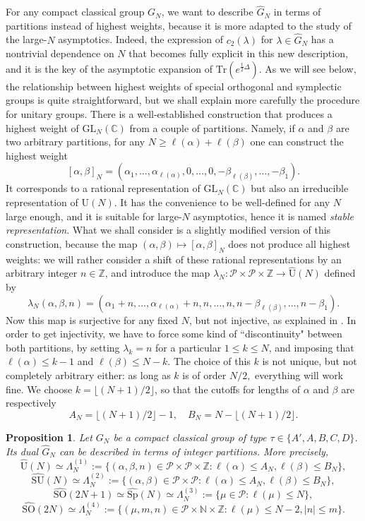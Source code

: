\documentclass[11pt,a4paper,reqno]{article}
\newtheorem{proposition}[theorem]{Proposition}
\theoremstyle{definition}
\theoremstyle{remark}
\newcommand\SU{{\mathrm{SU}}}
\newcommand\SO{{\mathrm{SO}}}
\newcommand\Sp{{\mathrm{Sp}}}
\newcommand\GL{{\mathrm{GL}}}
\newcommand\U{{\mathrm U}}
\newcommand\Z{{\mathbb Z}}
\newcommand\N{{\mathbb N}}
\newcommand\C{\mathbb{C}}
\newcommand\Tr{\mathrm{Tr}}
\newcommand\Pfr{\mathscr{P}}
\begin{document}
For any compact classical group $G_N$, we want to describe $\widehat{G}_N$ in terms of partitions instead of highest weights, because it is more adapted to the study of the large-$N$ asymptotics. Indeed, the expression of $c_2(\lambda)$ for $\lambda\in\widehat{G}_N$ has a nontrivial dependence on $N$ that becomes fully explicit in this new description, and it is the key of the asymptotic expansion of $\Tr(e^{\frac{t}{2}\Delta})$. As we will see below, the relationship between highest weights of special orthogonal and symplectic groups is quite straightforward, but we shall explain more carefully the procedure for unitary groups. There is a well-established construction \cite{Sta,Koi} that produces a highest weight of $\GL_N(\C)$ from a couple of partitions. Namely, if $\alpha$ and $\beta$ are two arbitrary partitions, for any $N\geq \ell(\alpha)+\ell(\beta)$ one can construct the highest weight
\[
[\alpha,\beta]_N=(\alpha_1,\ldots,\alpha_{\ell(\alpha)},0,\ldots,0,-\beta_{\ell(\beta)},\ldots,-\beta_1).
\]
It corresponds to a rational representation of $\GL_N(\C)$ but also an irreducible representation of $\U(N)$. It has the convenience to be well-defined for any $N$ large enough, and it is suitable for large-$N$ asymptotics, hence it is named \emph{stable representation}. What we shall consider is a slightly modified version of this construction, because the map $(\alpha,\beta)\mapsto [\alpha,\beta]_N$ does not produce all highest weights: we will rather consider a shift of these rational representations by an arbitrary integer $n\in\Z$, and introduce the map $\lambda_N:\Pfr\times\Pfr\times\Z\to\widehat{\U}(N)$ defined by
\[
\lambda_N(\alpha,\beta,n)=(\alpha_1+n,\ldots,\alpha_{\ell(\alpha)}+n,n,\ldots,n,n-\beta_{\ell(\beta)},\ldots,n-\beta_1).
\]
Now this map is surjective for any fixed $N$, but not injective, as explained in \cite[\S 2.2]{Lem}. In order to get injectivity, we have to force some kind of ``discontinuity" between both partitions, by setting $\lambda_k=n$ for a particular $1\leq k\leq N$, and imposing that $\ell(\alpha)\leq k-1$ and $\ell(\beta)\leq N-k$. The choice of this $k$ is not unique, but not completely arbitrary either: as long as $k$ is of order $N/2,$ everything will work fine. We choose $k=\lfloor(N+1)/2\rfloor$, so that the cutoffs for lengths of $\alpha$ and $\beta$ are respectively
\[
A_N=\lfloor(N+1)/2\rfloor-1,\quad B_N=N-\lfloor(N+1)/2\rfloor.
\]

\begin{proposition}\label{prop:dual_sets}
Let $G_N$ be a compact classical group of type $\tau\in\{A',A,B,C,D\}$. Its dual $\widehat{G}_N$ can be described in terms of integer partitions. More precisely,
\[
\widehat{\U}(N)\simeq \Lambda_N^{(1)}:=\{(\alpha,\beta,n)\in\Pfr\times\Pfr\times\Z:\ell(\alpha)\leq A_N,\ell(\beta)\leq B_N\},
\]
\[
\widehat{\SU}(N)\simeq \Lambda_N^{(2)}:= \{(\alpha,\beta)\in\Pfr\times\Pfr:\ell(\alpha)\leq A_N,\ell(\beta)\leq B_N\},
\]
\[
\widehat{\SO}(2N+1)\simeq\widehat{\Sp}(N)\simeq \Lambda_N^{(3)}:=\{\mu\in\Pfr:\ell(\mu)\leq N\},
\]
\[
\widehat{\SO}(2N)\simeq\Lambda_N^{(4)}:=\{(\mu,m,n)\in\Pfr\times\N\times\Z: \ell(\mu)\leq N-2, \vert n\vert\leq m\}.
\]
\end{proposition}
\end{document}
